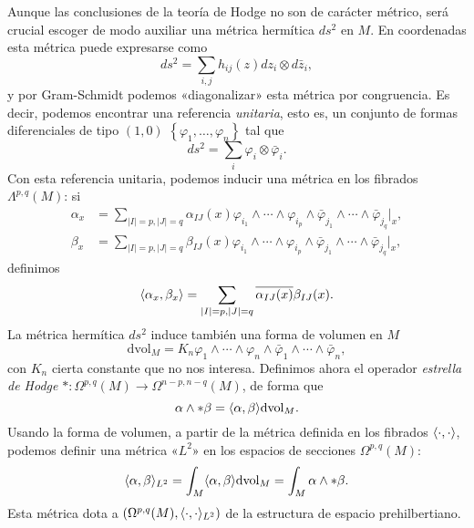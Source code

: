 \documentclass[12pt,a4paper]{article}
\theoremstyle{definition} \newtheorem{defn}[thm]{Definición}
\theoremstyle{definition} \newtheorem{ejemplo}[thm]{Ejemplo}
\theoremstyle{definition} \newtheorem{ejercicio}[thm]{Ejercicio}
\theoremstyle{remark} \newtheorem*{obs}{Observación}
\DeclarePairedDelimiter\esc{\langle}{\rangle}
\newcommand{\dvol}{\mathrm{dvol}}
\begin{document}
 Aunque las conclusiones de la teoría de Hodge no son de carácter métrico, será crucial escoger de modo auxiliar una métrica hermítica $ds^2$ en $M$. En coordenadas esta métrica puede expresarse como
 \begin{equation*}
   ds^2=\sum_{i,j} h_{ij}(z) dz_i \otimes d\bar{z}_i,
 \end{equation*}
 y por Gram-Schmidt podemos «diagonalizar» esta métrica por congruencia. Es decir, podemos encontrar una referencia \emph{unitaria}, esto es, un conjunto de formas diferenciales de tipo $(1,0)$ $\left\{ \varphi_1,\dots,\varphi_n \right\}$ tal que 
 \begin{equation*}
   ds^2=\sum_i \varphi_i \otimes \bar{\varphi}_i.
 \end{equation*}
 Con esta referencia unitaria, podemos inducir una métrica en los fibrados $\Lambda^{p,q}(M)$: si 
 \begin{align*}
   \alpha_x&= \sum_{|I|=p, |J|=q} \alpha_{IJ}(x) \varphi_{i_1} \wedge \cdots \wedge \varphi_{i_p} \wedge \bar{\varphi}_{j_1} \wedge \cdots \wedge \bar{\varphi}_{j_q}|_x, \\
   \beta_x&= \sum_{|I|=p, |J|=q} \beta_{IJ}(x) \varphi_{i_1} \wedge \cdots \wedge \varphi_{i_p} \wedge \bar{\varphi}_{j_1} \wedge \cdots \wedge \bar{\varphi}_{j_q}|_x ,
 \end{align*}
  definimos
  \begin{equation*}
    \esc{\alpha_x,\beta_x}=\sum_{|I|=p, |J|=q} \overline{\alpha_{IJ}(x)} \beta_{IJ}(x)   .
  \end{equation*}
  La métrica hermítica $ds^2$ induce también una forma de volumen en $M$
  \begin{equation*}
    \dvol_M=K_n \varphi_1 \wedge \cdots \wedge \varphi_n \wedge \bar{\varphi}_1 \wedge \cdots \wedge \bar{\varphi}_n,
  \end{equation*}
  con $K_n$ cierta constante que no nos interesa.
  Definimos ahora el operador \emph{estrella de Hodge} $*:\Omega^{p,q}(M) \rightarrow \Omega^{n-p,n-q}(M)$, de forma que
  \begin{equation*}
    \alpha \wedge *\beta = \esc{\alpha,\beta} \dvol_M.
  \end{equation*}
  Usando la forma de volumen, a partir de la métrica definida en los fibrados $\esc{\cdot,\cdot}$, podemos definir una métrica «$L^2$» en los espacios de secciones $\Omega^{p,q}(M)$:
  \begin{equation*}
    \esc{\alpha,\beta}_{L^2}=\int_M \esc{\alpha,\beta} \dvol_M = \int_M \alpha \wedge *\beta.
  \end{equation*}
  Esta métrica dota a $(\Omega^{p,q}(M), \esc{\cdot,\cdot}_{L^2})$ de la estructura de espacio prehilbertiano. 
\end{document}

